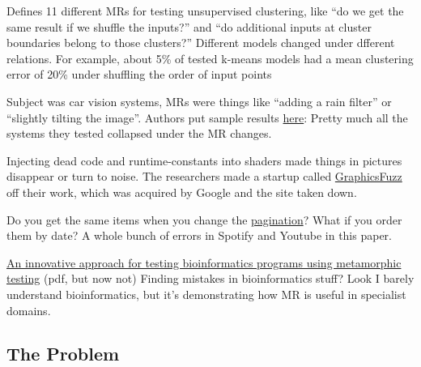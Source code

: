 \begin{mldescription}
Defines 11 different MRs for testing unsupervised clustering, like ``do
we get the same result if we shuffle the inputs?'' and ``do additional
inputs at cluster boundaries belong to those clusters?'' Different
models changed under dfferent relations. For example, about 5\% of
tested k-means models had a mean clustering error of 20\% under
shuffling the order of input points

Subject was car vision systems, MRs were things like ``adding a rain
filter'' or ``slightly tilting the image''. Authors put sample results
\href{https://deeplearningtest.github.io/deepTest/}{here}: Pretty much
all the systems they tested collapsed under the MR changes.

Injecting dead code and runtime-constants into shaders made things in
pictures disappear or turn to noise. The researchers made a startup
called
\href{https://web.archive.org/web/20180710214938/http://www.graphicsfuzz.com/}{GraphicsFuzz}
off their work, which was acquired by Google and the site taken down.

Do you get the same items when you change the
\href{https://github.com/spotify/web-api/issues/225}{pagination}? What
if you order them by date? A whole bunch of errors in Spotify and
Youtube in this paper.


\item{\href{https://bmcbioinformatics.biomedcentral.com/articles/10.1186/1471-2105-10-24}{An
innovative approach for testing bioinformatics programs using
metamorphic testing} (pdf, but now not)}
Finding mistakes in bioinformatics stuff? Look I barely understand
bioinformatics, but it's demonstrating how MR is useful in specialist
domains.
\end{mldescription}


\hypertarget{the-problem}{%
\subsection{The Problem}
\label{the-problem}}

